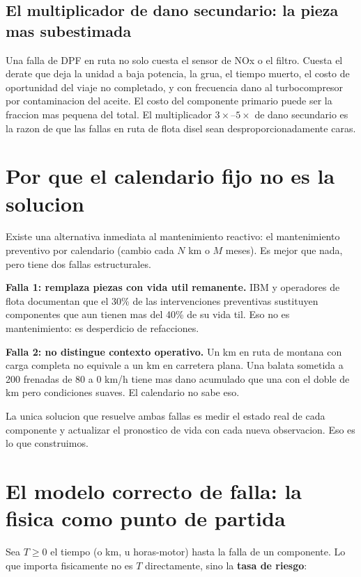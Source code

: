 \documentclass[10.5pt,a4paper]{article}
\begin{document}
\subsection{El multiplicador de dano secundario: la pieza mas subestimada}

Una falla de DPF en ruta no solo cuesta el sensor de NOx o el filtro.
Cuesta el derate que deja la unidad a baja potencia, la grua, el tiempo muerto,
el costo de oportunidad del viaje no completado, y con frecuencia dano al
turbocompresor por contaminacion del aceite. El costo del componente primario
puede ser la fraccion mas pequena del total. El multiplicador $3\times$--$5\times$
de dano secundario es la razon de que las fallas en ruta de flota disel sean
desproporcionadamente caras.

\section{Por que el calendario fijo no es la solucion}

Existe una alternativa inmediata al mantenimiento reactivo: el mantenimiento
preventivo por calendario (cambio cada $N$ km o $M$ meses). Es mejor que
nada, pero tiene dos fallas estructurales.

\textbf{Falla 1: remplaza piezas con vida util remanente.}
IBM y operadores de flota documentan que el 30\% de las intervenciones
preventivas sustituyen componentes que aun tienen mas del 40\% de su vida til.
Eso no es mantenimiento: es desperdicio de refacciones.

\textbf{Falla 2: no distingue contexto operativo.}
Un km en ruta de montana con carga completa no equivale a un km en carretera plana.
Una balata sometida a 200 frenadas de 80 a 0 km/h tiene mas dano acumulado
que una con el doble de km pero condiciones suaves. El calendario no sabe eso.

\medskip
La unica solucion que resuelve ambas fallas es medir el estado real de cada
componente y actualizar el pronostico de vida con cada nueva observacion.
Eso es lo que construimos.

\section{El modelo correcto de falla: la fisica como punto de partida}

Sea $T \geq 0$ el tiempo (o km, u horas-motor) hasta la falla de un componente.
Lo que importa fisicamente no es $T$ directamente, sino la \textbf{tasa de riesgo}:
\end{document}
